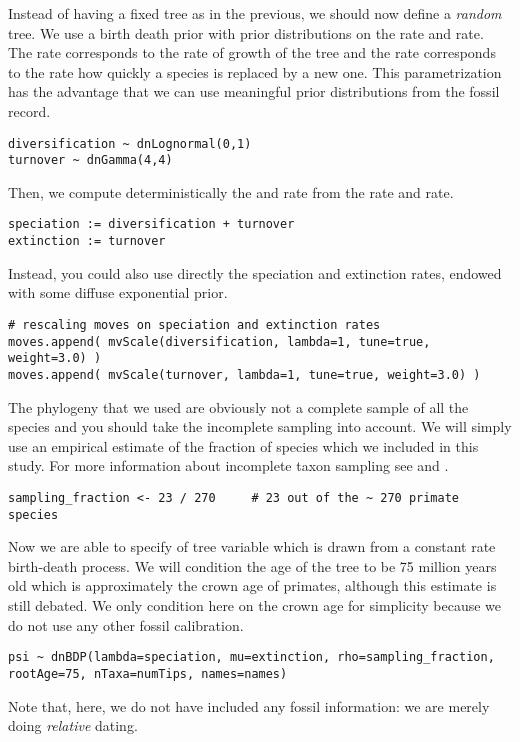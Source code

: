 Instead of having a fixed tree as in the previous, we should now define a \emph{random} tree. We use a birth death prior with prior distributions on the  rate and  rate.
The  rate corresponds to the rate of growth of the tree and the  rate corresponds to the rate how quickly a species is replaced by a new one.
This parametrization has the advantage that we can use meaningful prior distributions from the fossil record.
{\tt \small \begin{snugshade*}
\begin{lstlisting}
diversification ~ dnLognormal(0,1)
turnover ~ dnGamma(4,4)
\end{lstlisting}
\end{snugshade*}}
Then, we compute deterministically the  and  rate from the  rate and  rate.
{\tt \small \begin{snugshade*}
\begin{lstlisting}
speciation := diversification + turnover
extinction := turnover
\end{lstlisting}
\end{snugshade*}}
Instead, you could also use directly the speciation and extinction rates, \EG endowed with some diffuse exponential prior.
{\tt \small \begin{snugshade*}
\begin{lstlisting}
# rescaling moves on speciation and extinction rates
moves.append( mvScale(diversification, lambda=1, tune=true, weight=3.0) )
moves.append( mvScale(turnover, lambda=1, tune=true, weight=3.0) )
\end{lstlisting}
\end{snugshade*}}
The phylogeny that we used are obviously not a complete sample of all the species and you should take the incomplete sampling into account. We will simply use an empirical estimate of the fraction of species which we included in this study. For more information about incomplete taxon sampling see \cite{Hohna2011} and \cite{Hohna2014a}. 
{\tt \small \begin{snugshade*}
\begin{lstlisting}
sampling_fraction <- 23 / 270     # 23 out of the ~ 270 primate species
\end{lstlisting}
\end{snugshade*}}
Now we are able to specify of tree variable  which is drawn from a constant rate birth-death process. We will condition the age of the tree to be 75 million years old which is approximately the crown age of primates, although this estimate is still debated. We only condition here on the crown age for simplicity because we do not use any other fossil calibration.
{\tt \small \begin{snugshade*}
\begin{lstlisting}
psi ~ dnBDP(lambda=speciation, mu=extinction, rho=sampling_fraction, rootAge=75, nTaxa=numTips, names=names)
\end{lstlisting}
\end{snugshade*}}
Note that, here, we do not have included any fossil information: we are merely doing \emph{relative} dating. 

